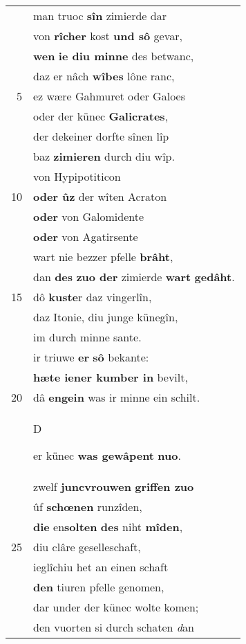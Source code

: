 \documentclass[8pt,a4paper,notitlepage]{article}
\begin{document}
\begin{table}[ht]
\begin{minipage}[t]{0.5\linewidth}
\begin{tabular}{rl}
 & man truoc \textbf{sîn} zimierde dar\\ 
 & von \textbf{rîcher} kost \textbf{und sô} gevar,\\ 
 & \textbf{wen} \textbf{ie diu minne} des betwanc,\\ 
 & daz er nâch \textbf{wîbes} lône ranc,\\ 
5 & ez wære Gahmuret oder Galoes\\ 
 & oder der künec \textbf{Galicrates},\\ 
 & der dekeiner dorfte sînen lîp\\ 
 & baz \textbf{zimieren} durch diu wîp.\\ 
 & von Hypipotiticon\\ 
10 & \textbf{oder ûz} der wîten Acraton\\ 
 & \textbf{oder} von Galomidente\\ 
 & \textbf{oder} von Agatirsente\\ 
 & wart nie bezzer pfelle \textbf{brâht},\\ 
 & dan \textbf{des} \textbf{zuo der} zimierde \textbf{wart} \textbf{gedâht}.\\ 
15 & dô \textbf{kuste}r daz vingerlîn,\\ 
 & daz Itonie, diu junge künegîn,\\ 
 & im durch minne sante.\\ 
 & ir triuwe \textbf{er} \textbf{sô} bekante:\\ 
 & \textbf{hæte iener kumber in} bevilt,\\ 
20 & dâ \textbf{engein} was ir minne ein schilt.\\ 
 & \begin{large}D\end{large}er künec \textbf{was gewâpent} \textbf{nuo}.\\ 
 & zwelf \textbf{juncvrouwen} \textbf{griffen zuo}\\ 
 & ûf \textbf{schœnen} runzîden,\\ 
 & \textbf{die} en\textbf{solten} \textbf{des} niht \textbf{mîden},\\ 
25 & diu clâre geselleschaft,\\ 
 & ieglîchiu het an einen schaft\\ 
 & \textbf{den} tiuren pfelle genomen,\\ 
 & dar under der künec wolte komen;\\ 
 & den vuorten si durch schaten \textit{d}an\\ 

\end{tabular}
\end{minipage}
\end{table}
\end{document}
